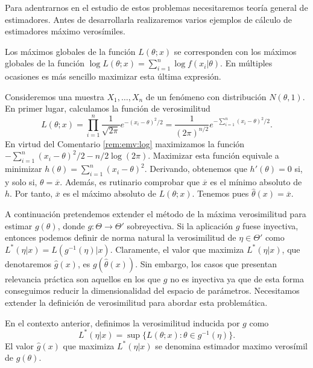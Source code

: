     Para adentrarnos en el estudio de estos problemas necesitaremos teoría general de estimadores. Antes de desarrollarla realizaremos varios ejemplos de cálculo de estimadores máximo verosímiles.

    \begin{remark} \label{rem:emv:log}
        Los máximos globales de la función $L(\theta ; x)$ se corresponden con los máximos globales de la función $\log L(\theta ; x) = \sum_{i = 1}^n \log f(x_i | \theta)$. En múltiples ocasiones es más sencillo maximizar esta última expresión.
    \end{remark}

    \begin{ex}
        Consideremos una muestra $X_1, \ldots, X_n$ de un fenómeno con distribución $N(\theta,1)$. En primer lugar, calculamos la función de verosimilitud
        \[L(\theta ; x) = \prod_{i = 1}^n \frac{1}{\sqrt{2\pi}} e^{-(x_i - \theta)^2 / 2} = \frac{1}{(2\pi)^{n/2}}e^{-\sum_{i = 1}^n (x_i - \theta)^2 / 2}.\]
        En virtud del Comentario \ref{rem:emv:log} maximizamos la función $-\sum_{i = 1}^n (x_i - \theta)^2 / 2 - n/2 \log(2\pi)$. Maximizar esta función equivale a minimizar $h(\theta) = \sum_{i = 1}^n (x_i - \theta)^2$. Derivando, obtenemos que $h'(\theta) = 0$ si, y solo si, $\theta = \overline{x}$. Además, es rutinario comprobar que $\overline{x}$ es el mínimo absoluto de $h$. Por tanto, $\overline{x}$ es el máximo absoluto de $L(\theta ; x)$. Tenemos pues $\hat{\theta}(x) = \overline{x}$.
    \end{ex}

    A continuación pretendemos extender el método de la máxima verosimilitud para estimar $g(\theta)$, donde $g : \Theta \to \Theta'$ sobreyectiva. Si la aplicación $g$ fuese inyectiva, entonces podemos definir de norma natural la verosimilitud de $\eta \in \Theta'$ como $L^*(\eta | x) = L(g^{-1}(\eta) | x)$. Claramente, el valor que maximiza $L^*(\eta | x)$, que denotaremos $\hat{g}(x)$, es $g(\hat{\theta}(x))$. Sin embargo, los casos que presentan relevancia práctica son aquellos en los que $g$ no es inyectiva ya que de esta forma conseguimos reducir la dimensionalidad del espacio de parámetros. Necesitamos extender la definición de verosimilitud para abordar esta problemática.

    \begin{definition}
        En el contexto anterior, definimos la verosimilitud inducida por $g$ como
        \[L^*(\eta|x) = \sup\{L(\theta ; x): \theta \in g^{-1}(\eta)\}.\]
        El valor $\hat{g}(x)$ que maximiza $L^*(\eta|x)$ se denomina estimador maximo verosímil de $g(\theta)$.
    \end{definition}

